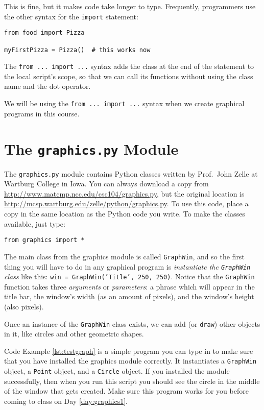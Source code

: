 This is fine, but it makes code take longer to type.  Frequently, programmers use the other syntax for the \texttt{import} statement:

\begin{verbatim}
from food import Pizza

myFirstPizza = Pizza()  # this works now
\end{verbatim}

The \texttt{from ... import ...} syntax adds the class at the end of the statement to the local script's scope, so that we can call its functions without using the class name and the dot operator.

We will be using the \texttt{from ... import ...} syntax when we create graphical programs in this course.

\section{The \texttt{graphics.py} Module}

The \texttt{graphics.py} module contains Python classes written by Prof.\ John Zelle at Wartburg College in Iowa.  You can always download a copy from \url{http://www.matcmp.ncc.edu/csc104/graphics.py}, but the original location is \url{http://mcsp.wartburg.edu/zelle/python/graphics.py}.  To use this code, place a copy in the same location as the Python code you write.  To make the classes available, just type:

\begin{verbatim}
from graphics import *
\end{verbatim}

The main class from the graphics module is called \texttt{GraphWin}, and so the first thing you will have to do in any graphical program is \textit{instantiate the \texttt{GraphWin} class} like this:  \texttt{win = GraphWin('Title', 250, 250)}.  Notice that the \texttt{GraphWin} function takes three \textit{arguments} or \textit{parameters}: a phrase which will appear in the title bar, the window's width (as an amount of pixels), and the window's height (also pixels).

Once an instance of the \texttt{GraphWin} class exists, we can add (or \texttt{draw}) other objects in it, like circles and other geometric shapes.

Code Example \ref{lst:testgraph} is a simple program you can type in to make sure that you have installed the graphics module correctly.  It instantiates a \texttt{GraphWin} object, a \texttt{Point} object, and a \texttt{Circle} object.  If you installed the module successfully, then when you run this script you should see the circle in the middle of the window that gets created.  Make sure this program works for you before coming to class on Day \ref{day:graphics1}.

